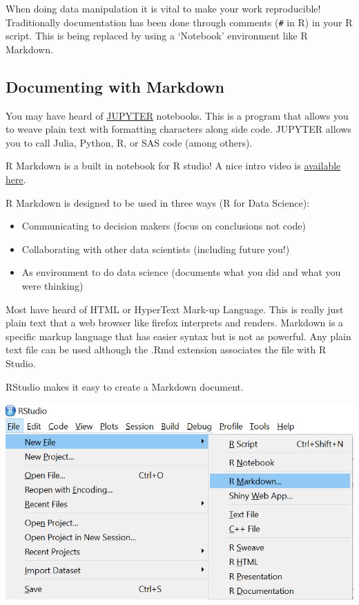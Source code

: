 \documentclass[
]{book}
\theoremstyle{definition}
\theoremstyle{definition}
\theoremstyle{definition}
\theoremstyle{remark}
\begin{document}
When doing data manipulation it is vital to make your work reproducible! Traditionally documentation has been done through comments (\texttt{\#} in R) in your R script. This is being replaced by using a `Notebook' environment like R Markdown.

\hypertarget{documenting-with-markdown}{%
\subsection{Documenting with Markdown}\label{documenting-with-markdown}}

You may have heard of \href{http://jupyter.org/}{JUPYTER} notebooks. This is a program that allows you to weave plain text with formatting characters along side code. JUPYTER allows you to call Julia, Python, R, or SAS code (among others).

R Markdown is a built in notebook for R studio! A nice intro video is \href{https://vimeo.com/178485416}{available here}.

R Markdown is designed to be used in three ways (R for Data Science):

\begin{itemize}
\item
  Communicating to decision makers (focus on conclusions not code)
\item
  Collaborating with other data scientists (including future you!)
\item
  As environment to do data science (documents what you did and what you were thinking)
\end{itemize}

Most have heard of HTML or HyperText Mark-up Language. This is really just plain text that a web browser like firefox interprets and renders. Markdown is a specific markup language that has easier syntax but is not as powerful. Any plain text file can be used although the .Rmd extension associates the file with R Studio.

RStudio makes it easy to create a Markdown document.

\begin{center}\includegraphics[width=0.75\linewidth]{img/startMD} \end{center}
\end{document}
